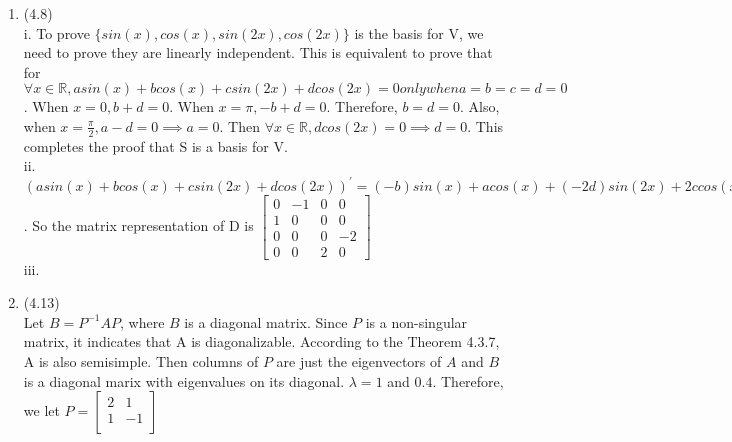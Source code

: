 \documentclass[letterpaper,12pt]{article}
\theoremstyle{definition}
\begin{document}
\begin{enumerate}
	\item(4.8)\\
	i. To prove $\{ sin(x), cos(x), sin(2x), cos(2x) \}$ is the basis for V, we need to prove they are linearly independent. This is equivalent to prove that for $\forall x \in \mathbb{R}, asin(x) + bcos(x) + csin(2x) + dcos(2x) = 0 only when a = b = c = d = 0 $. When $x=0, b + d = 0$. When $x = \pi, -b + d = 0$. Therefore, $b = d = 0$. Also, when $x = \frac{\pi}{2}, a-d = 0 \implies a = 0$. Then $\forall x \in \mathbb{R}, dcos(2x) = 0 \implies d = 0$. This completes the proof that S is a basis for V.\\
	ii. $(asin(x) +bcos(x) +csin(2x) +dcos(2x))^{'} = (-b)sin(x) + acos(x) +(-2d)sin(2x) + 2ccos(x)$. So the matrix representation of D is $\begin{bmatrix}
	   0 & -1 & 0 & 0 \\
	   1 & 0 & 0 & 0 \\
	   0 & 0 & 0 & -2 \\
	   0 & 0 & 2 & 0
	\end{bmatrix} $\\
	iii. \\

	\item(4.13)\\
	Let $B = P^{-1}AP$, where $B$ is a diagonal matrix. Since $P$ is a non-singular matrix, it indicates that A is diagonalizable. According to the Theorem 4.3.7, A is also semisimple. Then columns of  $P$ are just the eigenvectors of $A$ and $B$ is a diagonal marix with eigenvalues on its diagonal. $\lambda = 1$ and $0.4$. Therefore, we let $P = \begin{bmatrix}
	   2 &    1\\
	   1 & -1 \\
	\end{bmatrix}$\\


\end{enumerate}
\end{document}
